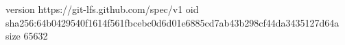 version https://git-lfs.github.com/spec/v1
oid sha256:64b0429540f1614f561fbcebc0d6d01e6885cd7ab43b298cf44da3435127d64a
size 65632
